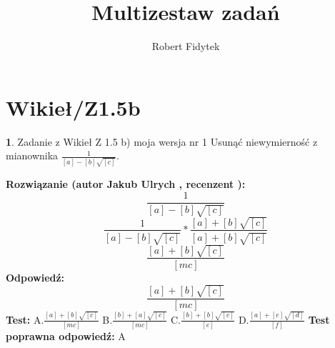 \documentclass[12pt, a4paper]{article}
\title{Multizestaw zadań}
\author{Robert Fidytek}
\date{}
\theoremstyle{definition} %
\newtheorem{zad}{}
\newcommand{\kategoria}[1]{\section{#1}} %
\newcommand{\zadStart}[1]{\begin{zad}#1\newline} %
\newcommand{\zadStop}{\end{zad}}   %
\newcommand{\rozwStart}[2]{\noindent \textbf{Rozwiązanie (autor #1 , recenzent #2): }\newline} %
\newcommand{\rozwStop}{\newline}                                            %
\newcommand{\odpStart}{\noindent \textbf{Odpowiedź:}\newline}    %
\newcommand{\odpStop}{\newline}                                             %
\newcommand{\testStart}{\noindent \textbf{Test:}\newline} %
\newcommand{\testStop}{\newline} %
\newcommand{\kluczStart}{\noindent \textbf{Test poprawna odpowiedź:}\newline} %
\newcommand{\kluczStop}{\newline} %
\begin{document}
\maketitle


\kategoria{Wikieł/Z1.5b}
\zadStart{Zadanie z Wikieł Z 1.5 b) moja wersja nr 1}
Usunąć niewymierność z mianownika $\frac{1}{[a]-[b]\sqrt{[c]}}$.
\zadStop
\rozwStart{Jakub Ulrych}{}
$$\frac{1}{[a]-[b]\sqrt{[c]}}$$
$$\frac{1}{[a]-[b]\sqrt{[c]}}*\frac{[a]+[b]\sqrt{[c]}}{[a]+[b]\sqrt{[c]}}$$
$$\frac{[a]+[b]\sqrt{[c]}}{[mc]}$$
\rozwStop
\odpStart
$$\frac{[a]+[b]\sqrt{[c]}}{[mc]}$$
\odpStop
\testStart
A.$\frac{[a]+[b]\sqrt{[c]}}{[mc]}$
B.$\frac{[b]+[a]\sqrt{[c]}}{[mc]}$
C.$\frac{[b]+[b]\sqrt{[c]}}{[e]}$
D.$\frac{[a]+[e]\sqrt{[d]}}{[f]}$
\testStop
\kluczStart
A
\kluczStop
\end{document}
